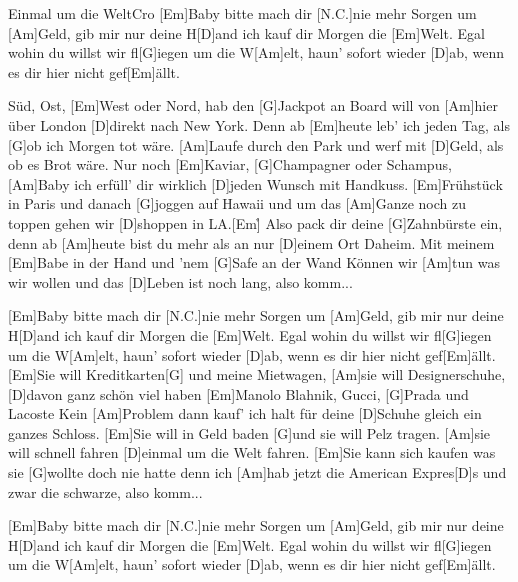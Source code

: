 \documentclass[../main.tex]{subfiles}
\begin{document}
\begin{song}[2]{Einmal um die Welt}{Cro}{}
[Em]Baby bitte mach dir [N.C.]nie mehr Sorgen um [Am]Geld,
gib mir nur deine H[D]and ich kauf dir Morgen die [Em]Welt.
Egal wohin du willst wir fl[G]iegen um die W[Am]elt,
haun' sofort wieder [D]ab, wenn es dir hier nicht gef[Em]{ä}llt.

Süd, Ost, [Em]West oder Nord, hab den [G]Jackpot an Board
will von [Am]hier über London [D]direkt nach New York.
Denn ab [Em]heute leb' ich jeden Tag, als [G]ob ich Morgen tot wäre.
[Am]Laufe durch den Park und werf mit [D]Geld, als ob es Brot wäre.
Nur noch [Em]Kaviar, [G]Champagner oder Schampus,
[Am]Baby ich erfüll' dir wirklich [D]jeden Wunsch mit Handkuss.
[Em]Frühstück in Paris und danach [G]joggen auf Hawaii
und um das [Am]Ganze noch zu toppen gehen wir [D]shoppen in LA.[Em]{\h}    
Also pack dir deine [G]Zahnbürste ein,
denn ab [Am]heute bist du mehr als an nur [D]einem Ort Daheim.
Mit meinem [Em]Babe in der Hand und 'nem [G]Safe an der Wand
Können wir [Am]tun was wir wollen und das [D]Leben ist noch lang, also komm...

[Em]Baby bitte mach dir [N.C.]nie mehr Sorgen um [Am]Geld,
gib mir nur deine H[D]and ich kauf dir Morgen die [Em]Welt.
Egal wohin du willst wir fl[G]iegen um die W[Am]elt,
haun' sofort wieder [D]ab, wenn es dir hier nicht gef[Em]{ä}llt.
[Em]Sie will Kreditkarten[G] und meine Mietwagen,
[Am]sie will Designerschuhe, [D]davon ganz schön viel haben
[Em]Manolo Blahnik, Gucci, [G]Prada und Lacoste
Kein [Am]Problem dann kauf' ich halt für deine [D]Schuhe gleich ein ganzes Schloss.
[Em]Sie will in Geld baden [G]und sie will Pelz tragen.
[Am]sie will schnell fahren [D]einmal um die Welt fahren.
[Em]Sie kann sich kaufen was sie [G]wollte doch nie hatte
denn ich [Am]hab jetzt die American Expres[D]s und zwar die schwarze, also komm...

[Em]Baby bitte mach dir [N.C.]nie mehr Sorgen um [Am]Geld,
gib mir nur deine H[D]and ich kauf dir Morgen die [Em]Welt.
Egal wohin du willst wir fl[G]iegen um die W[Am]elt,
haun' sofort wieder [D]ab, wenn es dir hier nicht gef[Em]{ä}llt.

\end{song}
\end{document}
